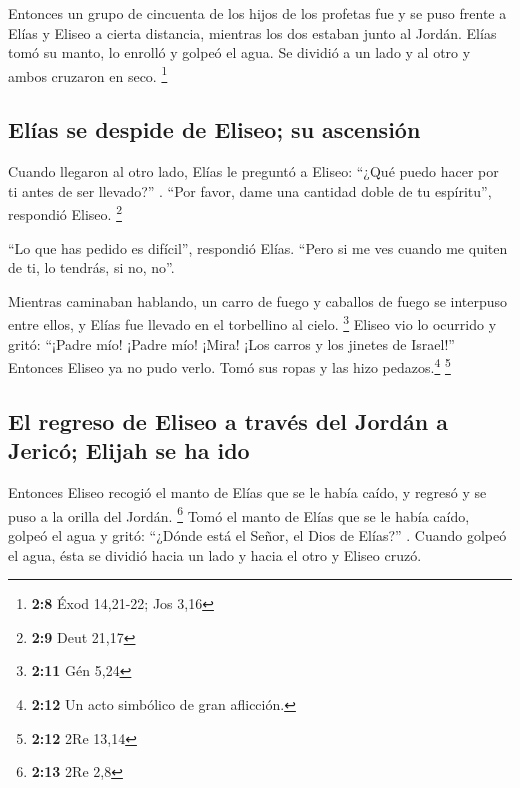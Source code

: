  Entonces un grupo de cincuenta de los hijos de los
profetas fue y se puso frente a Elías y Eliseo a cierta distancia,
mientras los dos estaban junto al Jordán.  Elías tomó su
manto, lo enrolló y golpeó el agua. Se dividió a un lado y al otro y
ambos cruzaron en seco. \footnote{\textbf{2:8} Éxod 14,21-22; Jos 3,16}

\hypertarget{eluxedas-se-despide-de-eliseo-su-ascensiuxf3n}{%
\subsection{Elías se despide de Eliseo; su
ascensión}\label{eluxedas-se-despide-de-eliseo-su-ascensiuxf3n}}

 Cuando llegaron al otro lado, Elías le preguntó a Eliseo:
``¿Qué puedo hacer por ti antes de ser llevado?'' . ``Por favor, dame
una cantidad doble de tu espíritu'', respondió Eliseo. \footnote{\textbf{2:9}
  Deut 21,17}

 ``Lo que has pedido es difícil'', respondió Elías.
``Pero si me ves cuando me quiten de ti, lo tendrás, si no, no''.

 Mientras caminaban hablando, un carro de fuego y
caballos de fuego se interpuso entre ellos, y Elías fue llevado en el
torbellino al cielo. \footnote{\textbf{2:11} Gén 5,24} 
Eliseo vio lo ocurrido y gritó: ``¡Padre mío! ¡Padre mío! ¡Mira! ¡Los
carros y los jinetes de Israel!'' Entonces Eliseo ya no pudo verlo. Tomó
sus ropas y las hizo pedazos.\footnote{\textbf{2:12} Un acto simbólico
  de gran aflicción.} \footnote{\textbf{2:12} 2Re 13,14}

\hypertarget{el-regreso-de-eliseo-a-travuxe9s-del-jorduxe1n-a-jericuxf3-elijah-se-ha-ido}{%
\subsection{El regreso de Eliseo a través del Jordán a Jericó; Elijah se
ha
ido}\label{el-regreso-de-eliseo-a-travuxe9s-del-jorduxe1n-a-jericuxf3-elijah-se-ha-ido}}

 Entonces Eliseo recogió el manto de Elías que se le
había caído, y regresó y se puso a la orilla del Jordán. \footnote{\textbf{2:13}
  2Re 2,8}  Tomó el manto de Elías que se le había caído,
golpeó el agua y gritó: ``¿Dónde está el Señor, el Dios de Elías?'' .
Cuando golpeó el agua, ésta se dividió hacia un lado y hacia el otro y
Eliseo cruzó.


